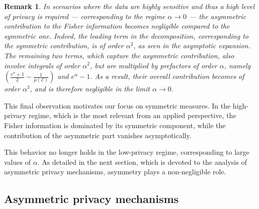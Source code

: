 \documentclass[a4paper, 11pt]{article}
\newtheorem{rem}{Remark}
\theoremstyle{definition}
\begin{document}
{\begin{rem}\label{rk: sym fisher alpha small}
In scenarios where the data are highly sensitive and thus a high level of privacy is required — corresponding to the regime \( \alpha \to 0 \) — the asymmetric contribution to the Fisher information becomes negligible compared to the symmetric one. Indeed, the leading term in the decomposition, corresponding to the symmetric contribution, is of order \( \alpha^2 \), as seen in the asymptotic expansion. The remaining two terms, which capture the asymmetric contribution, also involve integrals of order \( \alpha^2 \), but are multiplied by prefactors of order \( \alpha \), namely \( \left( \frac{e^\alpha + 1}{2} - \frac{1}{\mu(\mathcal{E})} \right) \) and \( e^\alpha - 1 \). As a result, their overall contribution becomes of order \( \alpha^3 \), and is therefore negligible in the limit \( \alpha \to 0 \). 
\end{rem}
This final observation motivates our focus on symmetric measures. In the high-privacy regime, which is the most relevant from an applied perspective, the Fisher information is dominated by its symmetric component, while the contribution of the asymmetric part vanishes asymptotically. 

This behavior no longer holds in the low-privacy regime, corresponding to large values of \( \alpha \). As detailed in the next section, which is devoted to the analysis of asymmetric privacy mechanisms, asymmetry plays a non-negligible role.



{\subsection{Asymmetric privacy mechanisms}{\label{ss:asymm}}

}}
\end{document}
